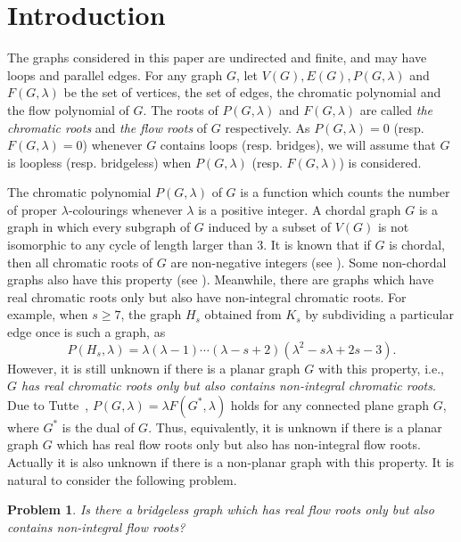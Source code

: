 \documentclass[11pt]{article}
\newtheorem{prob}{Problem}
\newcommand {\red} {\textcolor{red}}
\newcommand{\beeq}{\begin{equation}}
\newcommand{\eneq}{\end{equation}}
\newcommand {\relabel}[1] {\label{#1} \red{[*: #1]}}\newcommand {\rebibitem}[1] {\bibitem{#1} \red{[*: #1]}}%
\def\relabel {\label} \def\rebibitem {\bibitem}  %
\begin{document}

\section{Introduction}

The graphs considered in this paper 
are undirected and finite,
and may have loops and parallel edges. 
For any graph $G$, let $V(G), E(G), P(G,\lambda)$ 
and $F(G,\lambda)$ be the set of vertices,
the set of edges, the chromatic polynomial 
and the flow polynomial of $G$.
The roots of $P(G,\lambda)$ and $F(G,\lambda)$ 
are called {\it the chromatic roots}
and {\it the flow roots} of $G$ respectively. 
As $P(G,\lambda)=0$ (resp. $F(G,\lambda)=0$) 
whenever $G$ contains loops (resp. bridges), 
we will assume that $G$ is 
loopless (resp. bridgeless) 
when $P(G,\lambda)$  (resp. $F(G,\lambda)$) is considered.

The chromatic polynomial  $P(G,\lambda)$ of $G$ 
is a function which counts the number of proper $\lambda$-colourings whenever $\lambda$ is a positive integer. 
A chordal graph $G$ is a graph in which every subgraph 
of $G$ induced by a subset of $V(G)$ is not 
isomorphic to any cycle of length larger than 3. 
It is known that if $G$ is chordal, then 
all chromatic roots of $G$ are non-negative integers
(see \cite{dong2005, read1988, rea}). 
Some non-chordal graphs also have this property
(see \cite{dmi1980,dong2005, dong3, dong4, read1975}). 
Meanwhile, there are graphs which have real 
chromatic roots only but also have 
non-integral chromatic roots.
For example, when $s\ge 7$, 
the graph $H_s$ obtained from $K_s$ by 
subdividing a particular edge once is such a graph, as   
\beeq \relabel{eq1-1}
P(H_s,\lambda)=\lambda (\lambda-1)\cdots (\lambda -s+2)
(\lambda^2-s\lambda+2s-3).
\eneq 
However, it is still unknown if there is a 
planar graph $G$ with this property, i.e., 
{\it $G$ has real chromatic roots only 
but also contains non-integral chromatic roots}. 
Due to Tutte~\cite{tut3}, $P(G,\lambda)=\lambda F(G^*,\lambda)$
holds for any connected plane graph $G$, where 
$G^*$ is the dual of $G$.
Thus, equivalently, it is unknown if there is a 
planar graph $G$ which has real flow roots only 
but also has non-integral flow roots.
Actually it is also unknown if there is a non-planar graph 
with this property. 
It is natural to consider the following problem. 

\begin{prob}
\relabel{prob1} 
Is there a bridgeless graph which has real flow roots only 
but also contains non-integral flow roots?
\end{prob} 
\end{document}
